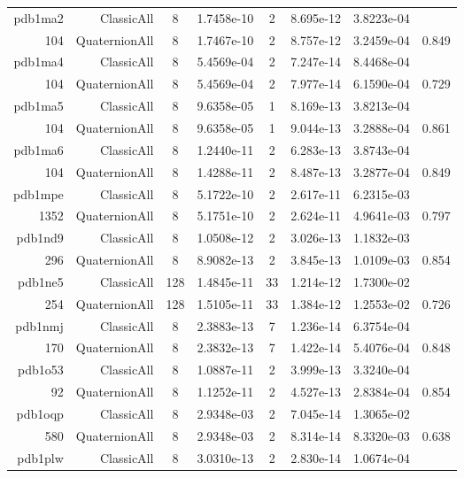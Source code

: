 \begin{xltabular}{\textwidth}{r|rcS[table-format=1.4e+2]cS[table-format=1.3e+2]S[table-format=1.4e+2]S[table-format=-1.3]}
pdb1ma2 & ClassicAll & 8 & 1.7458e-10 & 2 & 8.695e-12 & 3.8223e-04 & \\
104 & QuaternionAll & 8 & 1.7467e-10 & 2 & 8.757e-12 & 3.2459e-04 & 0.849\\  \addlinespace
pdb1ma4 & ClassicAll & 8 & 5.4569e-04 & 2 & 7.247e-14 & 8.4468e-04 & \\
104 & QuaternionAll & 8 & 5.4569e-04 & 2 & 7.977e-14 & 6.1590e-04 & 0.729\\  \addlinespace
pdb1ma5 & ClassicAll & 8 & 9.6358e-05 & 1 & 8.169e-13 & 3.8213e-04 & \\
104 & QuaternionAll & 8 & 9.6358e-05 & 1 & 9.044e-13 & 3.2888e-04 & 0.861\\  \addlinespace
pdb1ma6 & ClassicAll & 8 & 1.2440e-11 & 2 & 6.283e-13 & 3.8743e-04 & \\
104 & QuaternionAll & 8 & 1.4288e-11 & 2 & 8.487e-13 & 3.2877e-04 & 0.849\\  \addlinespace
pdb1mpe & ClassicAll & 8 & 5.1722e-10 & 2 & 2.617e-11 & 6.2315e-03 & \\
1352 & QuaternionAll & 8 & 5.1751e-10 & 2 & 2.624e-11 & 4.9641e-03 & 0.797\\  \addlinespace
pdb1nd9 & ClassicAll & 8 & 1.0508e-12 & 2 & 3.026e-13 & 1.1832e-03 & \\
296 & QuaternionAll & 8 & 8.9082e-13 & 2 & 3.845e-13 & 1.0109e-03 & 0.854\\  \addlinespace
pdb1ne5 & ClassicAll & 128 & 1.4845e-11 & 33 & 1.214e-12 & 1.7300e-02 & \\
254 & QuaternionAll & 128 & 1.5105e-11 & 33 & 1.384e-12 & 1.2553e-02 & 0.726\\  \addlinespace
pdb1nmj & ClassicAll & 8 & 2.3883e-13 & 7 & 1.236e-14 & 6.3754e-04 & \\
170 & QuaternionAll & 8 & 2.3832e-13 & 7 & 1.422e-14 & 5.4076e-04 & 0.848\\  \addlinespace
pdb1o53 & ClassicAll & 8 & 1.0887e-11 & 2 & 3.999e-13 & 3.3240e-04 & \\
92 & QuaternionAll & 8 & 1.1252e-11 & 2 & 4.527e-13 & 2.8384e-04 & 0.854\\  \addlinespace
pdb1oqp & ClassicAll & 8 & 2.9348e-03 & 2 & 7.045e-14 & 1.3065e-02 & \\
580 & QuaternionAll & 8 & 2.9348e-03 & 2 & 8.314e-14 & 8.3320e-03 & 0.638\\  \addlinespace
pdb1plw & ClassicAll & 8 & 3.0310e-13 & 2 & 2.830e-14 & 1.0674e-04 & \\

\end{xltabular}
